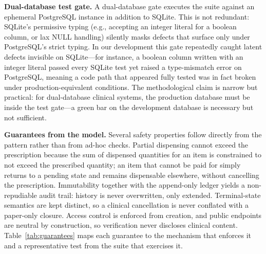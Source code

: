 \documentclass[conference]{IEEEtran}
\begin{document}
\textbf{Dual-database test gate.} A dual-database gate executes the suite against an ephemeral PostgreSQL instance in addition to SQLite. This is not redundant: SQLite's permissive typing (e.g., accepting an integer literal for a boolean column, or lax NULL handling) silently masks defects that surface only under PostgreSQL's strict typing. In our development this gate repeatedly caught latent defects invisible on SQLite---for instance, a boolean column written with an integer literal passed every SQLite test yet raised a type-mismatch error on PostgreSQL, meaning a code path that appeared fully tested was in fact broken under production-equivalent conditions. The methodological claim is narrow but practical: for dual-database clinical systems, the production database must be inside the test gate---a green bar on the development database is necessary but not sufficient.

\textbf{Guarantees from the model.} Several safety properties follow directly from the pattern rather than from ad-hoc checks. Partial dispensing cannot exceed the prescription because the sum of dispensed quantities for an item is constrained to not exceed the prescribed quantity; an item that cannot be paid for simply returns to a pending state and remains dispensable elsewhere, without cancelling the prescription. Immutability together with the append-only ledger yields a non-repudiable audit trail: history is never overwritten, only extended. Terminal-state semantics are kept distinct, so a clinical cancellation is never conflated with a paper-only closure. Access control is enforced from creation, and public endpoints are neutral by construction, so verification never discloses clinical content. Table~\ref{tab:guarantees} maps each guarantee to the mechanism that enforces it and a representative test from the suite that exercises it.
\end{document}
